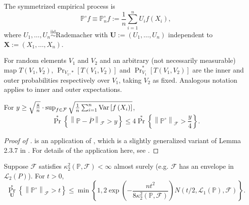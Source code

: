The symmetrized empirical process is
\begin{equation}
  \mathbb{P}^{\circ} f \equiv \mathbb{P}^{\circ}_{n} f := \frac{1}{n} \sum_{i =
  1}^{n} U_{i} f \left( X_{i} \right),
\end{equation}
where \(U_{1}, \dots, U_{n} \overset{\mathrm{iid}}{\sim} \text{Rademacher}\)
with \(\mathbf{U} := \left( U_{1}, \dots, U_{n} \right)\) independent to
\(\mathbf{X} := \left( X_{1}, \dots, X_{n} \right)\).

\begin{remark}
For random elements \(V_{1}\) and \(V_{2}\) and an arbitrary
(not necessarily measurable) map \(T \left( V_{1}, V_{2} \right)\),
\(\Pr_{V_{1}, \ast} \left[ T \left( V_{1}, V_{2} \right) \right]\) and
\(\Pr_{V_{1}}^{\ast} \left[ T \left( V_{1}, V_{2} \right) \right]\) are the
inner and outer probabilities respectively over \(V_{1}\), taking \(V_{2}\) as
fixed.
Analogous notation applies to inner and outer expectations.
\end{remark}

\begin{lemma}
\label{lem--ep-norm-sym-bound}
For \(y \geq \sqrt{\frac{8}{n}} \cdot \sup_{f \in \mathcal{F}} \sqrt{\frac{1}{n}
\sum_{i =
1}^{n} \mathrm{Var} \left[ f \left( X_{i} \right) \right]}\),
\begin{equation}
  \Pr^{\ast} \left\{ \left\| \mathbb{P} - \overline{P} \right\|_{\mathcal{F}} >
  y \right\} \leq 4 \Pr^{\ast} \left\{ \left\| \mathbb{P}^{\circ}
  \right\|_{\mathcal{F}} > \frac{y}{4} \right\}.
  \label{eqn--ep-norm-sym-bound}
\end{equation}
\end{lemma}

\begin{proof}[Proof of ]
 is an application of , which is
a slightly generalized variant of Lemma 2.3.7 in
\citet[p. 176]{2023vandervaartWeakConvergenceEmpirical}.
For details of the application here, see .
\end{proof}

\begin{lemma}
\label{lem--ep-sym-unif-hoeffding-cond}
Suppose \(\mathcal{F}\) satisfies \(\kappa_{2}^{2} \left( \mathbb{P},
\mathcal{F} \right) < \infty\) almost surely (e.g. \(\mathcal{F}\) has an
envelope in \(\mathscr{L}_{2} (P)\)).
For \(t > 0\),
\begin{equation}
  \Pr_{\mathbf{U}}^{\ast} \left\{ \left\| \mathbb{P}^{\circ}
  \right\|_{\mathcal{F}} > t \right\} \leq \min \left\{ 1, 2 \exp \left( -
  \frac{n t^{2}}{8 \kappa_{2}^{2} (\mathbb{P}, \mathcal{F})} \right) N \left( t
  / 2, \mathscr{L}_{1} (\mathbb{P}), \mathcal{F} \right) \right\}.
  \label{eqn--ep-sym-unif-hoeffding-cond}
\end{equation}
\end{lemma}

